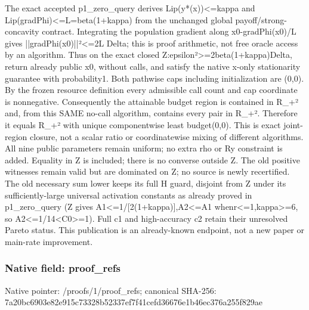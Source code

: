\documentclass[10pt,a4paper]{article}
\begin{document}
\begingroup\raggedright\sloppy The exact accepted p1\_\allowbreak{}zero\_\allowbreak{}query derives Lip(y*(x))<=\allowbreak{}kappa and Lip(gradPhi)<=\allowbreak{}L=\allowbreak{}beta(1+kappa) from the unchanged global payoff/\allowbreak{}strong-concavity contract. Integrating the population gradient along x0-gradPhi(x0)/\allowbreak{}L gives ||gradPhi(x0)||{\AtlasUnicodeText ²}\allowbreak{}<=\allowbreak{}2L Delta;\allowbreak{} this is proof arithmetic,\allowbreak{} not free oracle access by an algorithm. Thus on the exact closed Z:\allowbreak{}epsilon{\AtlasUnicodeText ²}\allowbreak{}>=\allowbreak{}2beta(1+kappa)Delta,\allowbreak{} return already public x0,\allowbreak{} without calls,\allowbreak{} and satisfy the native x-only stationarity guarantee with probability1. Both pathwise caps including initialization are (0,\allowbreak{}0). By the frozen resource definition every admissible call count and cap coordinate is nonnegative. Consequently the attainable budget region is contained in R\_\allowbreak{}+{\AtlasUnicodeText ²}\allowbreak{} and,\allowbreak{} from this SAME no-call algorithm,\allowbreak{} contains every pair in R\_\allowbreak{}+{\AtlasUnicodeText ²}\allowbreak{}. Therefore it equals R\_\allowbreak{}+{\AtlasUnicodeText ²}\allowbreak{} with unique componentwise least budget(0,\allowbreak{}0). This is exact joint-region closure,\allowbreak{} not a scalar ratio or coordinatewise mixing of different algorithms. All nine public parameters remain uniform;\allowbreak{} no extra rho or Ry constraint is added. Equality in Z is included;\allowbreak{} there is no converse outside Z. The old positive witnesses remain valid but are dominated on Z;\allowbreak{} no source is newly recertified. The old necessary sum lower keeps its full H guard,\allowbreak{} disjoint from Z under its sufficiently-large universal activation constants as already proved in p1\_\allowbreak{}zero\_\allowbreak{}query (Z gives A1<=\allowbreak{}1/\allowbreak{}[2(1+kappa)],\allowbreak{}A2<=\allowbreak{}A1 whenr<=\allowbreak{}1,\allowbreak{}kappa>=\allowbreak{}6,\allowbreak{} so A2<=\allowbreak{}1/\allowbreak{}14<C0>=\allowbreak{}1). Full c1 and high-accuracy c2 retain their unresolved Pareto status. This publication is an already-known endpoint,\allowbreak{} not a new paper or main-rate improvement.\par\endgroup

\subsubsection{Native field: proof\_\allowbreak{}refs}
Native pointer: /proofs/1/proof\_\allowbreak{}refs; canonical SHA-256: 7a20bc6903e82e915c73328b52337ef7f41cefd36676e1b46ec376a255f829ae
\end{document}

